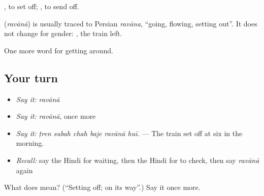  , to set off;  , to send off.

\begin{cousinweb}
\textbf{} (\emph{ravānā}) is usually traced to Persian \emph{ravāna}, \textquotedblleft{}going, flowing, setting out\textquotedblright{}. It does not change for gender:   , the train left.
\end{cousinweb}

\begin{grammarlens}[title={What you've built}]
One more word for getting around.
\end{grammarlens}

\subsection*{Your turn}
\begin{itemize}
\raggedright
  \item \emph{Say it:} \emph{ravānā}
  \item \emph{Say it:} \emph{ravānā}, once more
  \item \emph{Say it:} \emph{ṭren subah chah baje ravānā huī.} — The train set off at six in the morning.
  \item \emph{Recall:} say the Hindi for waiting, then the Hindi for to check, then say \emph{ravānā} again
\end{itemize}

\begin{tcolorbox}[breakable,colback=teal!4,colframe=teal!35!black,title={Before you move on}]
What does  mean? (\textquotedblleft{}Setting off; on its way\textquotedblright{}.) Say it once more.
\end{tcolorbox}
